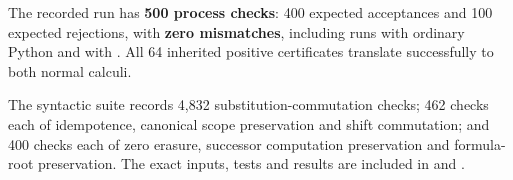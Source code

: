 The recorded run has \textbf{500 process checks}: 400 expected
acceptances and 100 expected rejections, with \textbf{zero mismatches},
including runs with ordinary Python and with .
All 64 inherited positive certificates translate successfully to both
normal calculi.

The syntactic suite records 4,832 substitution-commutation checks;
462 checks each of idempotence, canonical scope preservation and
shift commutation; and 400 checks each of zero erasure, successor
computation preservation and formula-root preservation.
The exact inputs, tests and results are included in
 and .
